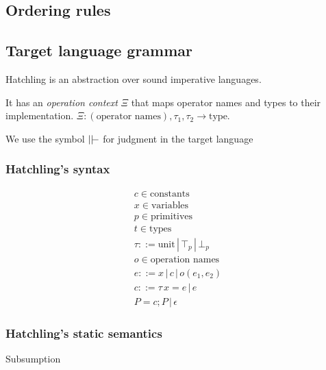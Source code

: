 \subsection{Ordering rules}
\label{fig:subtype}

\subsection{Target language grammar}
Hatchling is an abstraction over sound imperative languages.

It has an \textit{operation context} $\Xi$ that maps operator names and types to their implementation. $\Xi : (\textrm{operator names}), \tau_1, \tau_2 \rightarrow \textrm{type}$.

We use the symbol $\tvdash$ for judgment in the target language

\subsubsection{Hatchling's syntax}
\begin{gather*}
c \in\textrm{constants}\\
x \in\textrm{variables}\\
p\in\textrm{primitives}\\
t\in\textrm{types}\\
\tau ::= \textrm{unit} \,|\, \top_p \,|\, \bot_p \\
o \in \textrm{operation names} \\
e ::= x \,|\, c \,|\, o(e_1, e_2) \\
c ::= \tau \, x = e\,|\, e \\
P  =  c;P \,|\, \epsilon 
\end{gather*}

\subsubsection{Hatchling's static semantics}
Subsumption
\begin{mathpar}
\end{mathpar}

